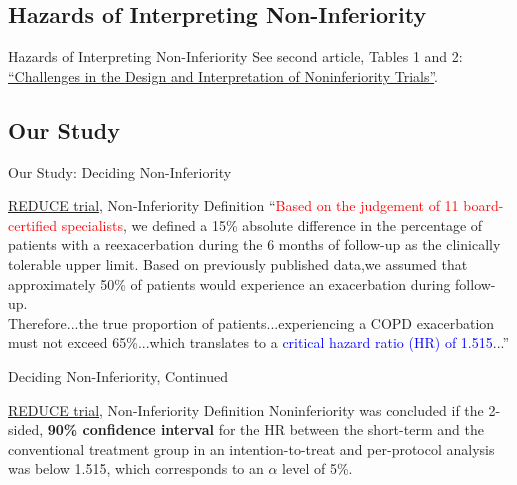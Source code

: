 \documentclass{beamer}
\newcommand{\pro}{\textcolor{blue}}
\newcommand{\con}{\textcolor{red}}
\newcommand{\reduce}{\href{https://doi.org/10.1001/jama.2013.5023}{REDUCE trial}}
\newcommand{\nonInf}{\href{https://doi.org/10.1056/NEJMra1510063}{``Challenges in the Design and Interpretation of Noninferiority Trials''}}
\begin{document}
	\subsection{Hazards of Interpreting Non-Inferiority}
		\begin{frame}{Hazards of Interpreting Non-Inferiority}
			See second article, Tables 1 and 2: \\
			\nonInf.
		\end{frame}
	\subsection{Our Study}
		\begin{frame}{Our Study: Deciding Non-Inferiority}
			\begin{alertblock}{\reduce, Non-Inferiority Definition}
				``\con{Based on the judgement of 11 board-certified specialists}, we defined a 15\% absolute difference in the percentage of patients with a reexacerbation during the 6 months of follow-up as the clinically tolerable upper limit. Based on previously published data,we assumed that approximately 50\% of patients would experience an exacerbation during follow-up.
				\\
				Therefore...the true proportion of patients...experiencing a COPD exacerbation must not exceed 65\%...which translates to a \pro{critical hazard ratio (HR) of 1.515}...''
			\end{alertblock}
		\end{frame}
		\begin{frame}{Deciding Non-Inferiority, Continued}
			\begin{alertblock}{\reduce,  Non-Inferiority Definition}
				Noninferiority was concluded if the 2-sided, \textbf{90\% confidence interval} for the HR between the short-term and the conventional treatment group in an intention-to-treat and per-protocol analysis was below 1.515, which corresponds to an $\alpha$ level of 5\%.
			\end{alertblock}
		\end{frame}
\end{document}

